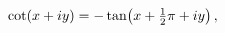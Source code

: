 \[\mathop{\cot\/}\nolimits\!\left(x+iy\right)=-\mathop{\tan\/}\nolimits\!\left(x%
+\tfrac{1}{2}\pi+iy\right),\]